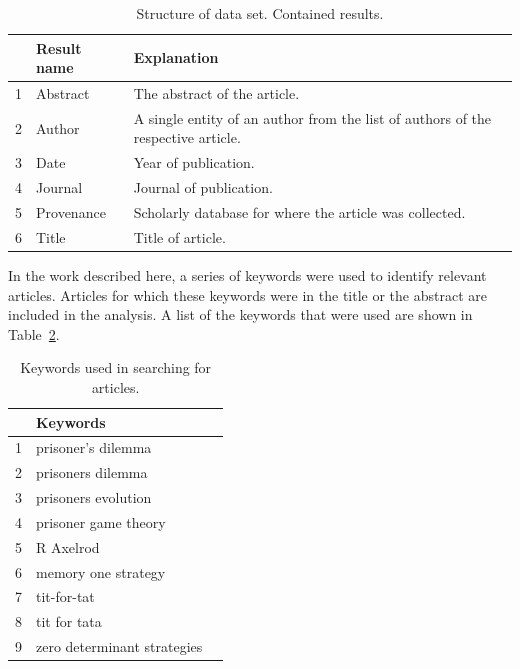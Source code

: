 \documentclass{article}
\begin{document}
\begin{table}[!hbtp]
    \begin{center}
        \begin{tabular}{lll}
            \toprule
             & Result name & Explanation \\
             \midrule
             1 & Abstract & The abstract of the article.\\ 
             2 & Author & A single entity of an author from the list of
             authors of the respective article.\\ 
             3 & Date & Year of publication.\\ 
             4 & Journal & Journal of publication.\\ 
             5 & Provenance & Scholarly database for where the article was
             collected.\\ 
             6 & Title & Title of article.\\ 
            \bottomrule
        \end{tabular}
    \end{center}
    \caption{Structure of data set. Contained results.}
    \label{table:result_set}
\end{table}

In the work described here, a series of keywords were used to identify relevant
articles. Articles for which these keywords were in the title or the abstract
are included in the analysis. A list of the keywords that were used are
shown in Table~\ref{table:search_keywords}.

\begin{table}[!hbtp]
    \begin{center}
        \begin{tabular}{lll}
            \toprule
             & Keywords & \\
            \midrule
             1 &  prisoner's dilemma & \\
             2 &  prisoners dilemma  & \\
             3 &  prisoners evolution & \\
             4 &  prisoner game theory & \\
             5 &  R Axelrod & \\
             6 &  memory one strategy & \\
             7 &  tit-for-tat & \\
             8 &  tit for tata & \\
             9 &  zero determinant strategies & \\
            \bottomrule
        \end{tabular}
    \end{center}
    \caption{Keywords used in searching for articles.}
    \label{table:search_keywords}
\end{table}
\end{document}
